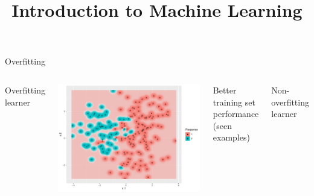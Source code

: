 \documentclass[11pt,compress,t,notes=noshow, xcolor=table]{beamer}
\title{Introduction to Machine Learning}
\institute{\href{https://compstat-lmu.github.io/lecture_i2ml/}{compstat-lmu.github.io/lecture\_i2ml}}
\date{}
\newenvironment{knitrout}{}{} %
\begin{document}








\begin{vbframe}{Overfitting}

\begin{columns}[T,onlytextwidth]
Overfitting learner \\
\vspace{0.5cm}
\begin{knitrout}\scriptsize
{}\color{fgcolor}

{\centering \includegraphics[width=\textwidth]{figure/eval_ofit_1} 

}

\end{knitrout}

Better training set performance (seen examples)

Non-overfitting learner \\
\vspace{0.5cm}
\begin{knitrout}\scriptsize
{}\color{fgcolor}


\end{knitrout}
\end{columns}
\end{vbframe}
\end{document}
